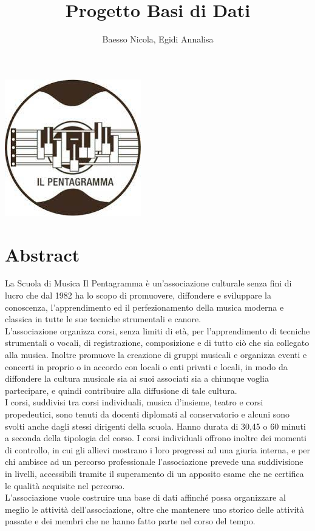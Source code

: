 \documentclass[11pt]{article}
\title{Progetto Basi di Dati}
\author{Baesso Nicola, Egidi Annalisa}
\begin{document}

\maketitle %
\begin{center} %
	\includegraphics{../logo.jpeg}	
\end{center}

\section{Abstract}
La Scuola di Musica Il Pentagramma è un’associazione culturale senza fini di lucro che dal 1982 ha lo scopo di promuovere, diffondere e sviluppare la conoscenza, l’apprendimento ed il perfezionamento della musica moderna e classica in tutte le sue tecniche strumentali e canore.\\
L'associazione organizza corsi, senza limiti di età, per l'apprendimento di tecniche strumentali o vocali, di registrazione, composizione e di tutto ciò che sia collegato alla musica. Inoltre promuove la creazione di gruppi musicali e organizza eventi e concerti in proprio o in accordo con locali o enti privati e locali, in modo da diffondere la cultura musicale sia ai suoi associati sia a chiunque voglia partecipare, e quindi contribuire alla diffusione di tale cultura.\\
I corsi, suddivisi tra corsi individuali, musica d'insieme, teatro e corsi propedeutici, sono tenuti da docenti diplomati al conservatorio e alcuni sono svolti anche dagli stessi dirigenti della scuola. Hanno durata di 30,45 o 60 minuti a seconda della tipologia del corso. I corsi individuali offrono inoltre dei momenti di controllo, in cui gli allievi mostrano i loro progressi ad una giuria interna, e per chi ambisce ad un percorso professionale l'associazione prevede una suddivisione in livelli, accessibili tramite il superamento di un apposito esame che ne certifica le qualità acquisite nel percorso.\\
L'associazione vuole costruire una base di dati affinché possa organizzare al meglio le attività dell'associazione, oltre che mantenere uno storico delle attività passate e dei membri che ne hanno fatto parte nel corso del tempo.
\end{document}
